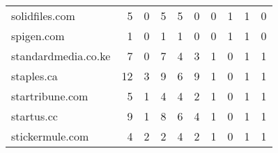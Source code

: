 \begin{tabular}{lrrrrrrrrr}
             solidfiles.com &                                5 &                                  0 &                                      5 &                            5 &                           0 &                                   0 &                                      1 &                             1 &                            0 \\
                 spigen.com &                                1 &                                  0 &                                      1 &                            1 &                           0 &                                   0 &                                      1 &                             1 &                            0 \\
        standardmedia.co.ke &                                7 &                                  0 &                                      7 &                            4 &                           3 &                                   1 &                                      0 &                             1 &                            1 \\
                 staples.ca &                               12 &                                  3 &                                      9 &                            6 &                           9 &                                   1 &                                      0 &                             1 &                            1 \\
            startribune.com &                                5 &                                  1 &                                      4 &                            4 &                           2 &                                   1 &                                      0 &                             1 &                            1 \\
                 startus.cc &                                9 &                                  1 &                                      8 &                            6 &                           4 &                                   1 &                                      0 &                             1 &                            1 \\
            stickermule.com &                                4 &                                  2 &                                      2 &                            4 &                           2 &                                   1 &                                      0 &                             1 &                            1 \\

\end{tabular}
